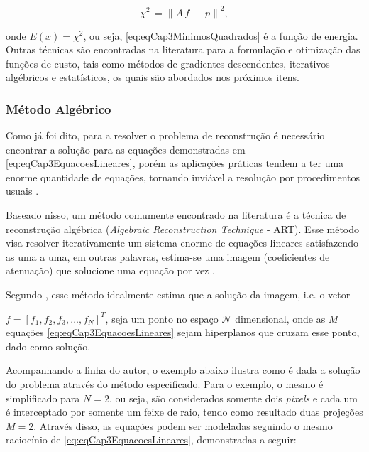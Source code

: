 {\begin{equation}
\chi^{2} \, = \left\| A \, f \, - \,p \right\|^{2},
\label{eq:eqCap3MinimosQuadrados}
\end{equation} 

\noindent onde $E(x) = \chi^{2}$, ou seja, \eqref{eq:eqCap3MinimosQuadrados} é a função de energia. Outras técnicas são encontradas na literatura para a formulação e otimização das funções de custo, tais como métodos de gradientes descendentes, iterativos algébricos e estatísticos, os quais são abordados nos próximos itens.


\subsubsection{Método Algébrico}

Como já foi dito, para a resolver o problema de reconstrução é necessário encontrar a solução para as equações demonstradas em \eqref{eq:eqCap3EquacoesLineares}, porém as aplicações práticas tendem a ter uma enorme quantidade de equações, tornando inviável a resolução por procedimentos usuais \cite[p. 210]{buzug2008computed}. 

Baseado nisso, um método comumente encontrado na literatura é a técnica de reconstrução algébrica (\textit{Algebraic Reconstruction Technique} - \acs{ART}). Esse método visa resolver iterativamente um sistema enorme de equações lineares satisfazendo-as uma a uma, em outras palavras, estima-se uma imagem (coeficientes de atenuação) que solucione uma equação por vez \cite{rangayyan2004biomedical}. 

Segundo , esse método idealmente estima que a solução da imagem, i.e. o vetor {$f = [f_{1},f_{2},f_{3},...,f_{N}]^{T}$, seja um ponto no espaço $\mathcal{N}$ dimensional, onde as $M$ equações \eqref{eq:eqCap3EquacoesLineares} sejam hiperplanos que cruzam esse ponto, dado como solução.

Acompanhando a linha do autor, o exemplo abaixo ilustra como é dada a solução do problema através do método especificado. Para o exemplo, o mesmo é simplificado para $N = 2$, ou seja, são considerados somente dois \textit{pixels} e cada um é interceptado por somente um feixe de raio, tendo como resultado duas projeções $M=2$. Através disso, as equações podem ser modeladas seguindo o mesmo raciocínio de \eqref{eq:eqCap3EquacoesLineares}, demonstradas a seguir:

}}
